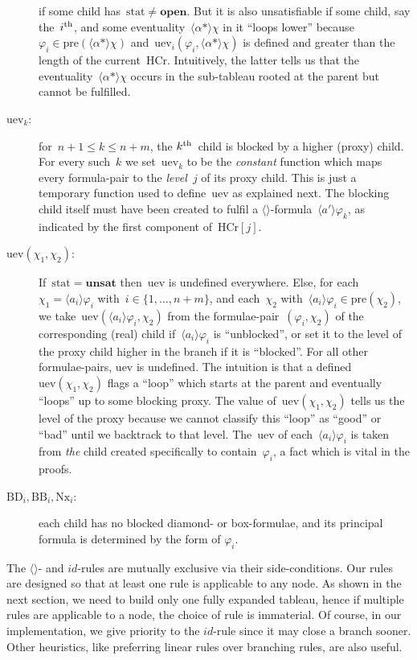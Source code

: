\documentclass{entcs}
\newcommand{\pea}[2]{\langle#1\rangle #2}
\newcommand{\prp}[1]{#1*}
\newcommand{\fea}{$\pea{}{}$}
\newcommand{\ppre}[1]{\mathrm{pre}(#1)}
\newcommand{\thc}{\mathrm{HCr}}
\newcommand{\tnext}{\mathrm{Nx}}
\newcommand{\tbdia}{\mathrm{BD}}
\newcommand{\tbbox}{\mathrm{BB}}
\newcommand{\tmrk}{\mathrm{stat}}
\newcommand{\tuev}{\mathrm{uev}}
\newcommand{\trid}{$id$}
\newcommand{\trea}{$\langle\rangle$}
\newcommand{\ttrue}{\mathbf{unsat}}
\newcommand{\tfalse}{\mathbf{open}}
\begin{document}
\begin{description}
  if some child has~$\tmrk \neq \tfalse$.
  But it is also unsatisfiable if some child, say the~$i^{\rm th}$,
  and some eventuality~$\pea{\prp{\alpha}}{\chi}$ in it ``loops lower''
  because~$\varphi_i \in \ppre{\pea{\prp{\alpha}}{\chi}}$
  and~$\tuev_i(\varphi_i, \pea{\prp{\alpha}}{\chi})$ is defined and greater than the length of the current~$\thc$.
  Intuitively, the latter tells us
  that the eventuality~$\pea{\prp{\alpha}}{\chi}$
  occurs in the sub-tableau rooted at the parent
  but cannot be fulfilled.
\item[\rm $\tuev_k$:] for~$n+1 \leq k \leq n+m$, the $k^{\rm th}$~child is blocked
  by a higher (proxy) child.
  For every such~$k$
  we set~$\tuev_k$ to be the \emph{constant} function
  which maps every formula-pair to the \emph{level}~$j$ of its proxy child.
  This is just a temporary function
  used to define~$\tuev$ as explained next.
  The blocking child itself must have been created
  to fulfil a \fea{}-formula~$\pea{a'}{\varphi_k}$,
  as indicated by the first component of~$\thc[j]$.
\item[\rm $\tuev(\chi_1, \chi_2)$:]
  If~$\tmrk = \ttrue$ then~$\tuev$ is undefined everywhere.
  Else,
  for each~$\chi_1 = \pea{a_i}{\varphi_i}$ with~$i \in \{ 1, \dotsc , n+m \}$,
  and each~$\chi_2$ with~$\pea{a_i}{\varphi_i} \in \ppre{\chi_2}$,
  we take~$\tuev(\pea{a_i}{\varphi_i}, \chi_2)$
  from the formulae-pair~$(\varphi_i, \chi_2)$ of the corresponding (real) child
  if~$\pea{a_i}{\varphi_i}$ is ``unblocked'',
  or set it to the level of the proxy child higher in the branch
  if it is ``blocked''.
  For all other formulae-pairs, $\tuev$ is undefined.
  The intuition is that a defined~$\tuev(\chi_1, \chi_2)$ flags
  a ``loop'' which starts at the parent
  and eventually ``loops'' up to some blocking proxy.
  The value of~$\tuev(\chi_1, \chi_2)$ tells us the level of the proxy
  because we cannot classify this ``loop'' as ``good'' or ``bad''
  until we backtrack to that level.
  The~$\tuev$ of each~$\pea{a_i}{\varphi_i}$ is taken from \emph{the} child
  created specifically to contain~$\varphi_i$,
  a fact which is vital in the proofs.
\item[\rm $\tbdia_i, \tbbox_i, \tnext_i$:]
  each child has no blocked diamond- or box-formulae,
  and its principal formula is determined by the form of $\varphi_i$.
\end{description}

The \trea{}- and \trid{}-rules are mutually exclusive via their
side-conditions.  Our rules are designed so that at least one rule is
applicable to any node. As shown in the next section, we need to build
only one fully expanded tableau, hence if multiple rules are
applicable to a node, the choice of rule is immaterial.
Of course, in our implementation, we give priority to the \trid{}-rule
since it may close a branch sooner. Other heuristics, like preferring
linear rules over branching rules, are also useful.
\end{document}
